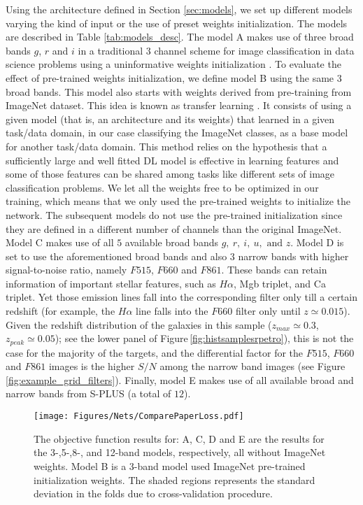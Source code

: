 \documentclass[fleqn,usenatbib]{mnras}
\begin{document}
Using the architecture defined in Section \ref{sec:models}, we set up different models varying the kind of input or the use of preset weights initialization. The models are described in Table \ref{tab:models_desc}.  The model A makes use of three broad bands $g$, $r$ and $i$ in a traditional $3$ channel scheme for image classification in data science problems \citep{deng2009imagenet} using a uninformative weights initialization \citep{glorot2010understanding}. To evaluate the effect of pre-trained weights initialization, we define model B using the same $3$ broad bands. This model also starts with weights derived from pre-training from ImageNet dataset. This idea is known as transfer learning \citep{yosinski2014transferable}. It consists of using a given model (that is, an architecture and its weights) that learned in a given task/data domain, in our case classifying the ImageNet classes, as a base model for another task/data domain. This method relies on the hypothesis that a sufficiently large and well fitted DL model is effective in learning features and some of those features can be shared among tasks like different sets of image classification problems. We let all the weights free to be optimized in our training, which means that we only used the pre-trained weights to initialize the network.
The subsequent models do not use the pre-trained initialization since they are defined in a different number of channels than the original ImageNet. Model C makes use of all $5$ available broad bands $g,~r,~i,~u,\text{ and }z$. Model D is set to use the aforementioned broad bands and also $3$ narrow bands with higher signal-to-noise ratio, namely $F515$, $F660$ and $F861$. These bands can retain information of important stellar features, such as $H\alpha$, Mgb triplet, and Ca triplet. Yet those emission lines  fall into the corresponding filter only till a certain redshift (for example, the  $H\alpha$ line falls into the $F660$ filter only until $z\simeq0.015$). Given the redshift distribution of the galaxies in this sample ($z_{max} \simeq 0.3$, $z_{peak} \simeq 0.05$);  see the lower panel of  Figure\,\ref{fig:histsamplesrpetro}), this is not the case for the majority of the targets, and the differential factor for   the $F515$, $F660$ and $F861$ images is the higher $S/N$ among the narrow band images (see Figure\,\ref{fig:example_grid_filters}). 
Finally, model E makes use of all available broad and narrow bands from S-PLUS (a total of $12$).

\begin{figure*}
\centering
\texttt{[image: Figures/Nets/ComparePaperLoss.pdf]}
    \caption{
    \label{fig:loss}
     The objective function results for: A, C, D and E are the results for the 3-,5-,8-, and 12-band models, respectively, all without ImageNet weights. Model B is a 3-band model used ImageNet pre-trained initialization weights. The shaded regions represents the standard deviation in the folds due to cross-validation procedure. 
    }
\end{figure*}
\end{document}
